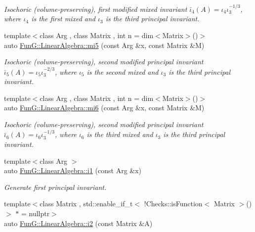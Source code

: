 \begin{DoxyCompactItemize}
\begin{DoxyCompactList}\small\item\em \-Isochoric (volume-\/preserving), first modified mixed invariant $ \bar\iota_4(A)=\iota_4\iota_3^{-1/3} $, where $\iota_4$ is the first mixed and $\iota_3$ is the third principal invariant. \end{DoxyCompactList}\item 
{\footnotesize template$<$class Arg , class Matrix , int n = dim$<$\-Matrix$>$()$>$ }\\auto \hyperlink{group__InvariantGroup_ga189bc682b34d13902da335c5eb502faa}{\-Fun\-G\-::\-Linear\-Algebra\-::mi5} (const \-Arg \&x, const \-Matrix \&\-M)
\begin{DoxyCompactList}\small\item\em \-Isochoric (volume-\/preserving), second modified principal invariant $ \bar\iota_5(A)=\iota_5\iota_3^{-2/3} $, where $\iota_5$ is the second mixed and $\iota_3$ is the third principal invariant. \end{DoxyCompactList}\item 
{\footnotesize template$<$class Arg , class Matrix , int n = dim$<$\-Matrix$>$()$>$ }\\auto \hyperlink{group__InvariantGroup_ga3e451f9e15fa95080f81d0c0f69f93e6}{\-Fun\-G\-::\-Linear\-Algebra\-::mi6} (const \-Arg \&x, const \-Matrix \&\-M)
\begin{DoxyCompactList}\small\item\em \-Isochoric (volume-\/preserving), second modified principal invariant $ \bar\iota_6(A)=\iota_6\iota_3^{-1/3} $, where $\iota_6$ is the third mixed and $\iota_3$ is the third principal invariant. \end{DoxyCompactList}\item 
{\footnotesize template$<$class Arg $>$ }\\auto \hyperlink{group__InvariantGroup_gafaead59b618d87239270f8eca2bf75c8}{\-Fun\-G\-::\-Linear\-Algebra\-::i1} (const \-Arg \&x)
\begin{DoxyCompactList}\small\item\em \-Generate first principal invariant. \end{DoxyCompactList}\item 
{\footnotesize template$<$class Matrix , std\-::enable\-\_\-if\-\_\-t$<$ !\-Checks\-::is\-Function$<$ Matrix $>$() $>$ $\ast$  = nullptr$>$ }\\auto \hyperlink{group__InvariantGroup_ga9e442bab8f203bcd5634a3d0e65bf802}{\-Fun\-G\-::\-Linear\-Algebra\-::i2} (const \-Matrix \&\-A)

\end{DoxyCompactItemize}
